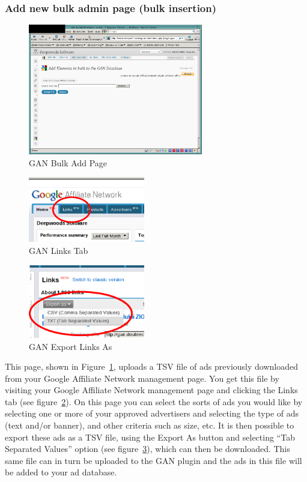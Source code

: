\documentclass[letterpaper]{article}
\begin{document}
\subsubsection{Add new bulk admin page (bulk insertion)}
\label{sect:addbulk}

\begin{figure}[ht]
\begin{centering}
\includegraphics[width=3in]{bulkadd.png}
\caption{GAN Bulk Add Page}
\label{fig:bulkadd}
\end{centering}
\end{figure}
\begin{figure}[ht]
\begin{centering}
\includegraphics[width=2in]{ganLinksTab.png}
\caption{GAN Links Tab}
\label{fig:ganLinksTab}
\end{centering}
\end{figure}
\begin{figure}[ht]
\begin{centering}
\includegraphics[width=2in]{ganExport.png}
\caption{GAN Export Links As}
\label{fig:ganExport}
\end{centering}
\end{figure}
This page, shown in Figure~\ref{fig:bulkadd}, uploads a TSV file of ads
previously downloaded from your Google Affiliate Network management
page. You get this file by visiting your Google Affiliate Network
management page and clicking the Links tab (see
figure~\ref{fig:ganLinksTab}). On this page you can select the sorts of
ads you would like by selecting one or more of your approved
advertisers and selecting the type of ads (text and/or banner), and
other criteria such as size, etc. It is then possible to export these
ads as a TSV file, using the Export As button and selecting ``Tab
Separated Values'' option (see figure~\ref{fig:ganExport}), which can
then be downloaded. This same file can in turn be uploaded to the GAN
plugin and the ads in this file will be added to your ad database.
\end{document}
